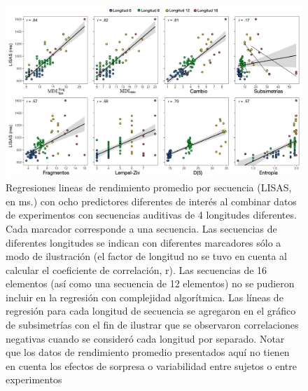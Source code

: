 \begin{figure}[t!]
   \includegraphics[scale=0.8]{figuras/plosbio/journal.pcbi.1008598.g009_SP.PNG}
   
   \centering

   \caption{Regresiones lineas de rendimiento promedio por secuencia (LISAS, en ms.) con ocho predictores diferentes de interés al combinar datos de experimentos con secuencias auditivas de 4 longitudes diferentes. Cada marcador corresponde a una secuencia. Las secuencias de diferentes longitudes se indican con diferentes marcadores sólo a modo de ilustración (el factor de longitud no se tuvo en cuenta al calcular el coeficiente de correlación, r). Las secuencias de 16 elementos (así como una secuencia de 12 elementos) no se pudieron incluir en la regresión con complejidad algorítmica. Las líneas de regresión para cada longitud de secuencia se agregaron en el gráfico de subsimetrías con el fin de ilustrar que se observaron correlaciones negativas cuando se consideró cada longitud por separado. Notar que los datos de rendimiento promedio presentados aquí no tienen en cuenta los efectos de sorpresa o variabilidad entre sujetos o entre experimentos}
   \label{PlosBIO-F9}
\end{figure}

